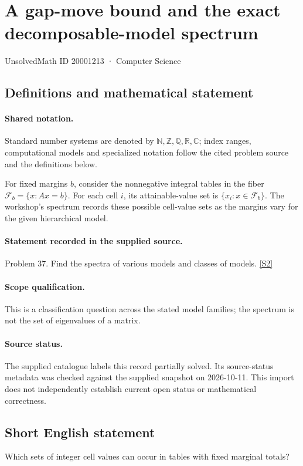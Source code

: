 \documentclass[11pt]{article}
\newcommand{\sref}[2]{\hyperlink{source:#1:#2}{[S#2]}}
\begin{document}
\setcounter{section}{20001212}
\section{A gap-move bound and the exact decomposable-model spectrum}\label{20001213}
{\small\sffamily UnsolvedMath ID 20001213 · Computer Science}
\subsection{Definitions and mathematical statement}

\paragraph{Shared notation.}Standard number systems are denoted by $\mathbb N,\mathbb Z,\mathbb Q,\mathbb R,\mathbb C$; index ranges, computational models and specialized notation follow the cited problem source and the definitions below.


For fixed margins $b$, consider the nonnegative integral tables in the fiber $\mathcal F_b=\{x:Ax=b\}$. For each cell $i$, its attainable-value set is $\{x_i:x\in\mathcal F_b\}$. The workshop's spectrum records these possible cell-value sets as the margins vary for the given hierarchical model.
\paragraph{Statement recorded in the supplied source.}
Problem 37. Find the spectra of various models and classes of models. \sref{20001213}{2}
\paragraph{Scope qualification.}
This is a classification question across the stated model families; the spectrum is not the set of eigenvalues of a matrix.
\paragraph{Source status.}
The supplied catalogue labels this record partially solved. Its source-status metadata was checked against the supplied snapshot on 2026-10-11. This import does not independently establish current open status or mathematical correctness.
\subsection{Short English statement}
Which sets of integer cell values can occur in tables with fixed marginal totals?
\end{document}
